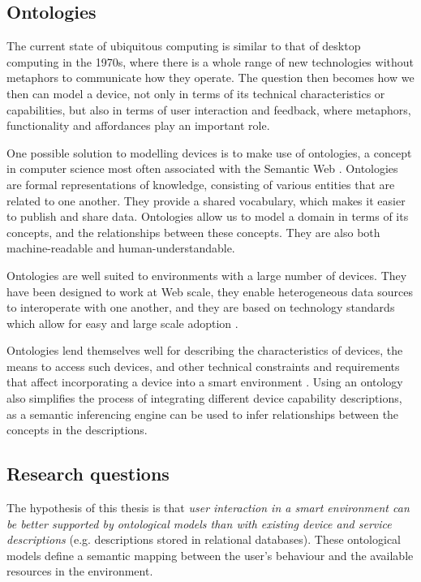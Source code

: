 \subsection{Ontologies}

The current state of ubiquitous computing is similar to that of desktop computing in the 1970s, where there is a whole range of new technologies without metaphors to communicate how they operate. The question then becomes how we then can model a device, not only in terms of its technical characteristics or capabilities, but also in terms of user interaction and feedback, where metaphors, functionality and affordances play an important role.

One possible solution to modelling devices is to make use of ontologies, a concept in computer science most often associated with the Semantic Web \cite{Berners-Lee2001}. Ontologies are formal representations of knowledge, consisting of various entities that are related to one another. They provide a shared vocabulary, which makes it easier to publish and share data. Ontologies allow us to model a domain in terms of its concepts, and the relationships between these concepts. They are also both machine-readable and human-understandable.

Ontologies are well suited to environments with a large number of devices. They have been designed to work at Web scale, they enable heterogeneous data sources to interoperate with one another, and they are based on technology standards which allow for easy and large scale adoption \cite{Sabou2010}.
 
Ontologies lend themselves well for describing the characteristics of devices, the means to access such devices, and other technical constraints and requirements that affect incorporating a device into a smart environment \cite{Owl2004}. Using an ontology also simplifies the process of integrating different device capability descriptions, as a semantic inferencing engine can be used to infer relationships between the concepts in the descriptions.


\subsection{Research questions}

The hypothesis of this thesis is that \emph{user interaction in a smart environment can be better supported by ontological models than with existing device and service descriptions} (e.g. descriptions stored in relational databases). These ontological models define a semantic mapping between the user's behaviour and the available resources in the environment.

